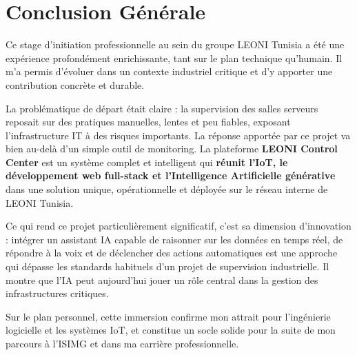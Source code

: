 \documentclass[12pt,a4paper]{report}
\begin{document}
\chapter*{Conclusion Générale}
Ce stage d'initiation professionnelle au sein du groupe LEONI Tunisia a été une expérience profondément enrichissante, tant sur le plan technique qu'humain. Il m'a permis d'évoluer dans un contexte industriel critique et d'y apporter une contribution concrète et durable.

La problématique de départ était claire : la supervision des salles serveurs reposait sur des pratiques manuelles, lentes et peu fiables, exposant l'infrastructure IT à des risques importants. La réponse apportée par ce projet va bien au-delà d'un simple outil de monitoring. La plateforme \textbf{LEONI Control Center} est un système complet et intelligent qui \textbf{réunit l'IoT, le développement web full-stack et l'Intelligence Artificielle générative} dans une solution unique, opérationnelle et déployée sur le réseau interne de LEONI Tunisia.

Ce qui rend ce projet particulièrement significatif, c'est sa dimension d'innovation : intégrer un assistant IA capable de raisonner sur les données en temps réel, de répondre à la voix et de déclencher des actions automatiques est une approche qui dépasse les standards habituels d'un projet de supervision industrielle. Il montre que l'IA peut aujourd'hui jouer un rôle central dans la gestion des infrastructures critiques.

Sur le plan personnel, cette immersion confirme mon attrait pour l'ingénierie logicielle et les systèmes IoT, et constitue un socle solide pour la suite de mon parcours à l'ISIMG et dans ma carrière professionnelle.
\end{document}
